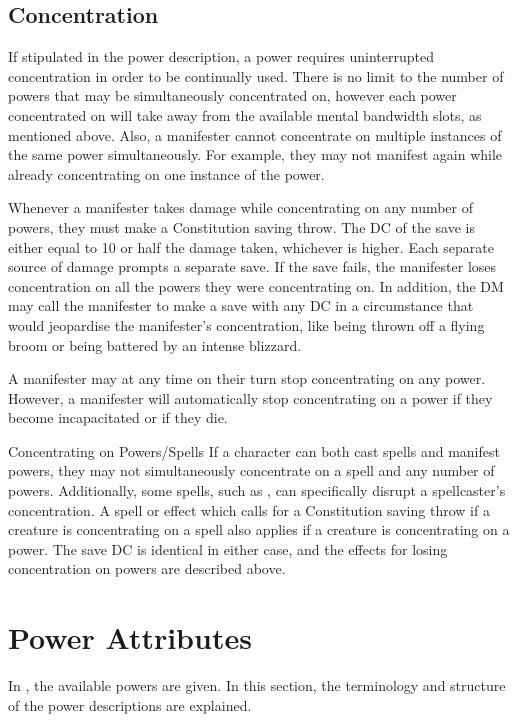 \subsection{Concentration}
\label{sub:concentration}
If stipulated in the power description,
a power requires uninterrupted concentration
in order to be continually used.
There is no limit to the number of powers that may be
simultaneously concentrated on,
however each power concentrated on will take away from the
available mental bandwidth slots, as mentioned above.
Also, a manifester cannot concentrate on multiple instances of the same power simultaneously.
For example,
they may not manifest  again while already concentrating
on one instance of the power.

Whenever a manifester takes damage while
concentrating on any number of powers,
they must make a Constitution saving throw.
The DC of the save is either equal to 10 or half the damage taken,
whichever is higher.
Each separate source of damage prompts a separate save.
If the save fails,
the manifester loses concentration on all the powers they were
concentrating on.
In addition, the DM may call the manifester to make a
save with any DC in a circumstance that would
jeopardise the manifester's concentration,
like being thrown off a flying broom or
being battered by an intense blizzard.

A manifester may at any time on their turn
stop concentrating on any power.
However, a manifester will automatically stop concentrating on a power
if they become incapacitated or if they die.

\begin{DndSidebar}[float=htbp]{Concentrating on Powers/Spells}
    If a character
    can both cast spells and manifest powers,
    they may not simultaneously concentrate on a spell
    and any number of powers.
    Additionally, some spells, such as ,
    can specifically disrupt a spellcaster's concentration.
    A spell or effect which calls for a Constitution saving throw
    if a creature is concentrating on a spell
    also applies if a creature is concentrating on a power.
    The save DC is identical in either case,
    and the effects for losing concentration on powers
    are described above.
\end{DndSidebar}

\section{Power Attributes}
\label{sec:power_attributes}
In ,
the available powers are given.
In this section,
the terminology and structure of the power descriptions are explained.


